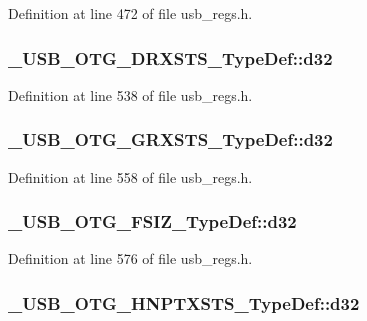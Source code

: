 Definition at line 472 of file usb\-\_\-regs.\-h.

\hypertarget{group___u_s_b___o_t_g___d_r_i_v_e_r_gaea4bd787e51cf95a95ed7f5b8683b2f9}{
\subsubsection[{d32}]{ \-\_\-\-U\-S\-B\-\_\-\-O\-T\-G\-\_\-\-D\-R\-X\-S\-T\-S\-\_\-\-Type\-Def\-::d32}}\label{group___u_s_b___o_t_g___d_r_i_v_e_r_gaea4bd787e51cf95a95ed7f5b8683b2f9}


Definition at line 538 of file usb\-\_\-regs.\-h.

\hypertarget{group___u_s_b___o_t_g___d_r_i_v_e_r_gab071a096d316aba8721b227e86994e8d}{
\subsubsection[{d32}]{ \-\_\-\-U\-S\-B\-\_\-\-O\-T\-G\-\_\-\-G\-R\-X\-S\-T\-S\-\_\-\-Type\-Def\-::d32}}\label{group___u_s_b___o_t_g___d_r_i_v_e_r_gab071a096d316aba8721b227e86994e8d}


Definition at line 558 of file usb\-\_\-regs.\-h.

\hypertarget{group___u_s_b___o_t_g___d_r_i_v_e_r_ga14d845ee3d6d63ffda6e97083de02de5}{
\subsubsection[{d32}]{ \-\_\-\-U\-S\-B\-\_\-\-O\-T\-G\-\_\-\-F\-S\-I\-Z\-\_\-\-Type\-Def\-::d32}}\label{group___u_s_b___o_t_g___d_r_i_v_e_r_ga14d845ee3d6d63ffda6e97083de02de5}


Definition at line 576 of file usb\-\_\-regs.\-h.

\hypertarget{group___u_s_b___o_t_g___d_r_i_v_e_r_ga45ca79f639e05d3ece30649050c81084}{
\subsubsection[{d32}]{ \-\_\-\-U\-S\-B\-\_\-\-O\-T\-G\-\_\-\-H\-N\-P\-T\-X\-S\-T\-S\-\_\-\-Type\-Def\-::d32}}\label{group___u_s_b___o_t_g___d_r_i_v_e_r_ga45ca79f639e05d3ece30649050c81084}


